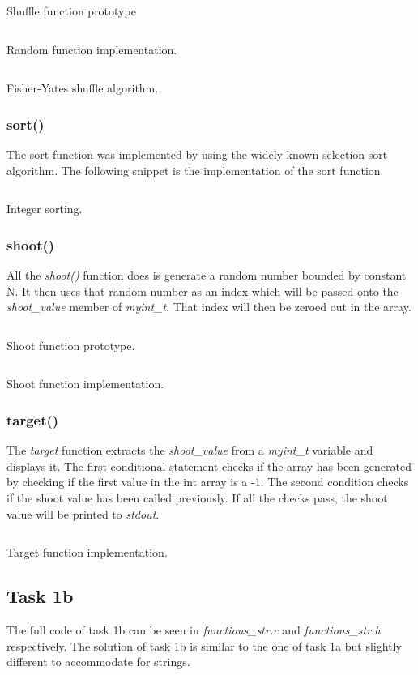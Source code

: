 \documentclass[a4paper, 12pt, titlepage]{article}
\newenvironment{code}{\captionsetup{type=listing}}{}
\newcommand{\sourcecode}[3]{
    \begin{code}
      \inputminted[linenos,numbersep=5pt,gobble=0,frame=lines,framesep=2mm,]{c}{#1}
        \caption{#2}
        \label{lst: #3}
    \end{code}
  }
\begin{document}
\begin{onehalfspacing}
  \sourcecode{snippets/int_shuffle_header.c}{Shuffle function prototype}{task1a_shuffle_prototype}
  \sourcecode{snippets/random_utils.c}{Random function implementation.}{task1a_random}
  \sourcecode{snippets/int_shuffle.c}{Fisher-Yates shuffle algorithm.}{task1a_shuffle}

  \subsubsection{sort()}
  The sort function was implemented by using the widely known selection sort algorithm. The following snippet is the implementation of the sort function.
  \sourcecode{snippets/task1a_sort.c}{Integer sorting.}{task1a_sort}

  \clearpage

  \subsubsection{shoot()}
  All the \emph{shoot()} function does is generate a random number bounded by constant N. It then uses that random number as an index which will be passed onto the \emph{shoot\_value} member of \emph{myint\_t}. That index will then be zeroed out in the array.

  \sourcecode{snippets/int_shoot_header.c}{Shoot function prototype.}{task1a_shoot_prototype}
  \sourcecode{snippets/int_shoot_implementation.c}{Shoot function implementation.}{task1a_shoot}

  \subsubsection{target()}
  The \emph{target} function extracts the \emph{shoot\_value} from a \emph{myint\_t} variable and displays it. The first conditional statement checks if the array has been generated by checking if the first value in the int array is a -1. The second condition checks if the shoot value has been called previously. If all the checks pass, the shoot value will be printed to \emph{stdout}.
  \sourcecode{snippets/int_target.c}{Target function implementation.}{task1a_target}


  \subsection{Task 1b}
  The full code of task 1b can be seen in \emph{functions\_str.c} and \emph{functions\_str.h} respectively. The solution of task 1b is similar to the one of task 1a but slightly different to accommodate for strings.


\end{onehalfspacing}
\end{document}
